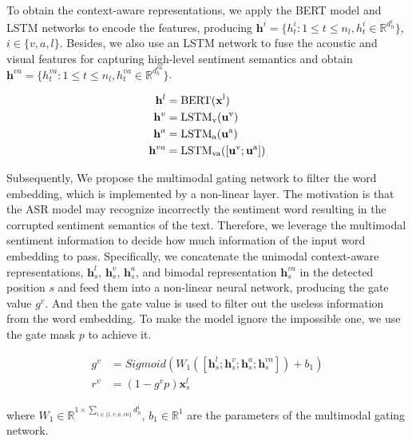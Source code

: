 \documentclass[11pt]{article}
\begin{document}
To obtain the context-aware representations, we apply the BERT model and LSTM networks to encode the features, producing $\mathbf h^i=\{h_t^i : 1 \le t \le n_l, h_t^i \in \mathbb R^{d^i_h}\}$, $i \in \{v, a, l\}$. Besides, we also use an LSTM network to fuse the acoustic and visual features for capturing high-level sentiment semantics and obtain $\mathbf h^{va}=\{h_t^{va} : 1 \le t \le n_{l}, h_t^{va} \in \mathbb R^{d^{va}_h}\}$. 

\begin{equation}
\begin{aligned}
\mathbf h^l &=\rm {BERT}(\mathbf x^l) \\
\mathbf h^v &=\rm {LSTM_v}(\mathbf u^v) \\
\mathbf h^a &=\rm {LSTM_a}(\mathbf u^a) \\ 
\mathbf h^{va} &=\rm {LSTM_{va}}([\mathbf u^v; \mathbf u^a]) \\
\end{aligned}
\end{equation}

Subsequently, We propose the multimodal gating network to filter the word embedding, which is implemented by a non-linear layer. The motivation is that the ASR model may recognize incorrectly the sentiment word resulting in the corrupted sentiment semantics of the text. Therefore, we leverage the multimodal sentiment information to decide how much information of the input word embedding to pass. Specifically, we concatenate the unimodal context-aware representations, $\mathbf h^l_s$, $\mathbf h^v_s$, $\mathbf h^a_s$, and bimodal representation $\mathbf h^{va}_s$ in the detected position $s$ and feed them into a non-linear neural network, producing the gate value $g^v$. And then the gate value is used to filter out the useless information from the word embedding. To make the model ignore the impossible one, we use the gate mask $p$ to achieve it.

\begin{equation}
\begin{aligned}
g^v &= Sigmoid(W_1([\mathbf h^l_s; \mathbf h^v_s; \mathbf h^a_s; \mathbf h^{va}_s]) + b_1) \\
r^v &=  (1 - g^vp) \mathbf x^l_s
\end{aligned}
\end{equation}

where $W_{1} \in \mathbb R^{1 \times \sum_{i \in \{l, v, a, va\}} d^i_h}$, $b_1 \in \mathbb R^1$ are the parameters of the multimodal gating network.
\end{document}
